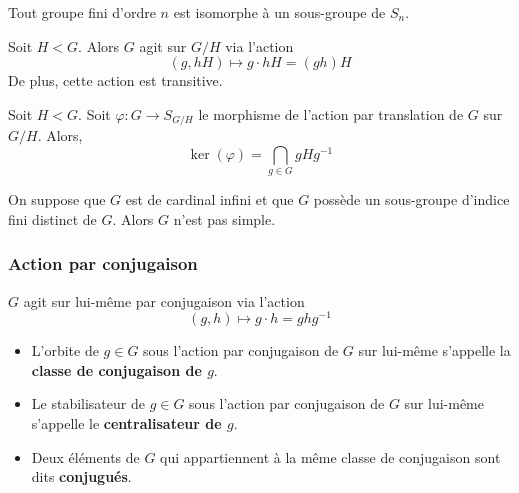 	\begin{application}
		Tout groupe fini d'ordre $n$ est isomorphe à un sous-groupe de $S_n$.
	\end{application}

	\begin{proposition}
		Soit $H < G$. Alors $G$ agit sur $G/H$ via l'action
		\[ (g, hH) \mapsto g \cdot hH = (gh)H \]
		De plus, cette action est transitive.
	\end{proposition}

	\begin{proposition}
		Soit $H < G$. Soit $\varphi : G \rightarrow S_{G/H}$ le morphisme de l'action par translation de $G$ sur $G/H$. Alors,
		\[ \ker(\varphi) = \bigcap_{g \in G} gHg^{-1} \]
	\end{proposition}


	\begin{application}
		On suppose que $G$ est de cardinal infini et que $G$ possède un sous-groupe d'indice fini distinct de $G$. Alors $G$ n'est pas simple.
	\end{application}

	\subsubsection{Action par conjugaison}


	\begin{proposition}
		$G$ agit sur lui-même par conjugaison via l'action
		\[ (g, h) \mapsto g \cdot h = ghg^{-1} \]
	\end{proposition}

	\begin{definition}
		\begin{itemize}
			\item L'orbite de $g \in G$ sous l'action par conjugaison de $G$ sur lui-même s'appelle la \textbf{classe de conjugaison de $g$}.
			\item Le stabilisateur de $g \in G$ sous l'action par conjugaison de $G$ sur lui-même s'appelle le \textbf{centralisateur de $g$}.
			\item Deux éléments de $G$ qui appartiennent à la même classe de conjugaison sont dits \textbf{conjugués}.
		\end{itemize}
	\end{definition}


